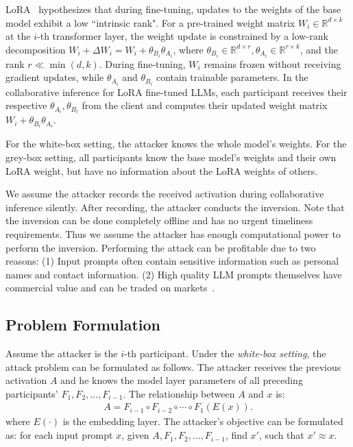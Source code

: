 LoRA~\cite{lora} hypothesizes that during fine-tuning, updates to the weights of the base model exhibit a low ``intrinsic rank".   For a pre-trained weight matrix $W_i \in \mathbb{R}^{d \times k}$ at the $i$-th transformer layer, the weight update is constrained by a low-rank decomposition  $W_i+\Delta W_i=W_i+\theta_{B_i} \theta_{A_i}$, where $\theta_{B_i} \in \mathbb{R}^{d \times r}, \theta_{A_i} \in \mathbb{R}^{r \times k}$, and the rank $r \ll \min (d, k)$. During fine-tuning, $W_i$ remains frozen without receiving gradient updates, while $\theta_{A_i}$ and $\theta_{B_i}$ contain trainable parameters. In the collaborative inference for LoRA fine-tuned LLMs, each participant  receives their respective  $\theta_{A_i}, \theta_{B_i}$ from the client and computes their updated weight matrix $W_i+\theta_{B_i} \theta_{A_i}$. 


For the white-box setting, the attacker knows the whole model's weights. 
For the grey-box setting, all participants know the base model's weights and  their own LoRA weight, but have no information about the LoRA weights of others.


We assume the attacker records the received activation during collaborative inference silently. After recording, the attacker conducts the inversion. Note that the inversion can be done completely offline and has no urgent timeliness requirements. Thus we assume  the attacker has enough computational power to perform the inversion. Performing the attack can be profitable due to two reasons: (1) Input prompts
often contain sensitive information such as personal names and
contact information. (2) High quality LLM prompts themselves
 have commercial value and can be traded on markets~\cite{promptbase,promptmarket}.





\subsection{Problem Formulation} 
Assume the attacker is the $i$-th participant. Under the \emph{white-box setting}, the attack problem can be formulated as follows. The attacker receives the previous activation $A$ and he knows the model layer parameters of all preceding  participants'  $F_1, F_2, \ldots, F_{i-1}$.  The relationship between $A$ and $x$ is:
\begin{align}
    A= F_{i-1}\circ F_{i-2} \circ \cdots \circ F_{1} (E(x)).
\end{align}
where $E(\cdot)$ is the embedding layer. The attacker's objective can be formulated as: for each input prompt $x$, given $A, F_1, F_2, \ldots, F_{i-1}$, find $x'$, such that $x'\approx x$.


